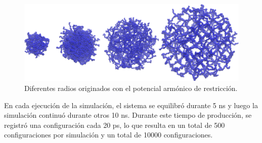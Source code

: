 \begin{figure}[!ht]
	\centering
	\includegraphics[width=0.5\linewidth]{Figures/graph-anexos/geles_radios.png}
	\caption{Diferentes radios originados con el potencial arm\'onico de restricci\'on. }
	\label{fig:anexo:geles}
\end{figure}



En cada ejecuci\'on de la simulaci\'on, el sistema se equilibr\'o durante 5 ns y luego la simulaci\'on continu\'o durante otros 10 ns. Durante este tiempo de producci\'on, se registr\'o una configuraci\'on cada 20 ps, lo que resulta en un total de 500 configuraciones por simulaci\'on y un total de 10000 configuraciones.
